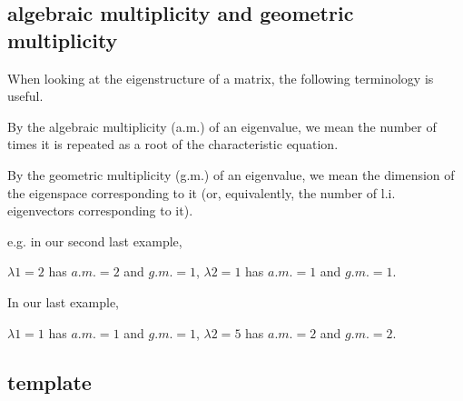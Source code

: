 \documentclass{extarticle}
\begin{document}
\begin{tcolorbox}[enhanced jigsaw,sharp corners,coltext=black,colback=Red!25!white,boxrule=0pt,breakable,size=minimal]
\subsection{algebraic multiplicity and geometric multiplicity}

When looking at the eigenstructure of a matrix, the following terminology is useful.

By the algebraic multiplicity (a.m.) of an eigenvalue, we mean the number of times it is repeated as a root of the characteristic equation.

By the geometric multiplicity (g.m.) of an eigenvalue, we mean the dimension of the eigenspace corresponding to it (or, equivalently, the number of l.i. eigenvectors corresponding to it).

e.g. in our second last example,

$\lambda1 = 2$ has $a.m.=2$ and $g.m.=1$, $\lambda2 = 1$ has $a.m.=1$ and $g.m.=1$.

In our last example,

$\lambda1 = 1$ has $a.m.=1$ and $g.m.=1$, $\lambda2 = 5$ has $a.m.=2$ and $g.m.=2$.
\end{tcolorbox}




\begin{tcolorbox}[enhanced jigsaw,sharp corners,coltext=black,colback=BurntOrange!25!white,boxrule=0pt,breakable,size=minimal]
\subsection{template}

\end{tcolorbox}




\iftoggle{editing}{%
}{%
  \end{multicols}
}
\end{document}
